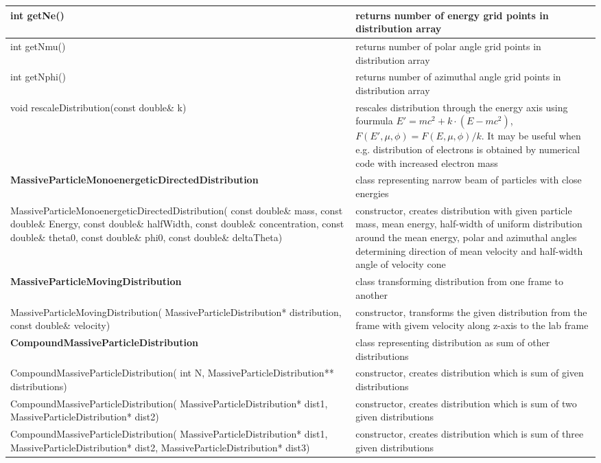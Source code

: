 \begin{small}
\begin{xtabular}{|p{0.57\textwidth}|p{0.43\textwidth}|}
		\hline
		int getNe() & returns number of energy grid points in distribution array\\
		\hline
		int getNmu() & returns number of polar angle grid points in distribution array\\
		\hline
		int getNphi() & returns number of azimuthal angle grid points in distribution array\\
		\hline
		void rescaleDistribution(const double\& k) & rescales distribution through the energy axis using fourmula $E' = mc^2 + k\cdot(E-mc^2)$, $F(E',\mu, \phi)=F(E,\mu, \phi)/k$. It may be useful when e.g. distribution of electrons is obtained by numerical code with increased electron mass\\
		\hline
		\textbf{MassiveParticleMonoenergeticDirectedDistribution} & class representing narrow beam of particles with close energies\\
		\hline
		MassiveParticleMonoenergeticDirectedDistribution( const double\& mass, const double\& Energy, const double\& halfWidth, const double\& concentration, const double\& theta0, const double\& phi0, const double\& deltaTheta) & constructor, creates distribution with given particle mass, mean energy, half-width of uniform distribution around the mean energy, polar and azimuthal angles determining direction of mean velocity and half-width angle of velocity cone\\
		\hline
		\textbf{MassiveParticleMovingDistribution} & class transforming distribution from one frame to another\\
		\hline
		MassiveParticleMovingDistribution( MassiveParticleDistribution* distribution, const double\& velocity) & constructor, transforms the given distribution from the frame with givem velocity along z-axis to the lab frame\\
		\hline
		\textbf{CompoundMassiveParticleDistribution} & class representing distribution as sum of other distributions\\
		\hline
		CompoundMassiveParticleDistribution( int N, MassiveParticleDistribution** distributions) & constructor, creates distribution which is sum of given distributions\\
		\hline
		CompoundMassiveParticleDistribution( MassiveParticleDistribution* dist1, MassiveParticleDistribution* dist2) & constructor, creates distribution which is sum of two given distributions\\
		\hline
		CompoundMassiveParticleDistribution( MassiveParticleDistribution* dist1, MassiveParticleDistribution* dist2, MassiveParticleDistribution* dist3) & constructor, creates distribution which is sum of three given distributions\\

\end{xtabular}
\end{small}
